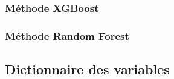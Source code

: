 \documentclass[french,]{tp}
\begin{document}
\hypertarget{muxe9thode-xgboost}{%
\subsubsection{Méthode XGBoost}\label{muxe9thode-xgboost}}

\hypertarget{muxe9thode-random-forest}{%
\subsubsection{Méthode Random Forest}\label{muxe9thode-random-forest}}

\newpage

\hypertarget{dictionnaire-des-variables}{%
\subsection{Dictionnaire des variables}\label{dictionnaire-des-variables}}
\end{document}
